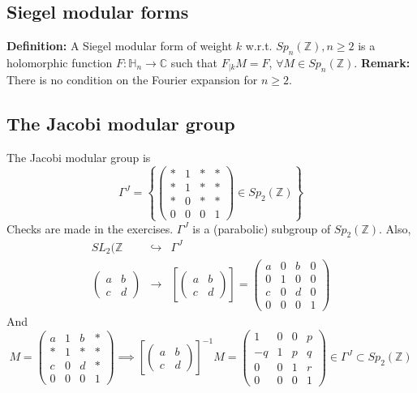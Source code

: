 \documentclass[10pt,a4paper]{article}
\begin{document}
\subsection{Siegel modular forms}
\textbf{Definition: } A Siegel modular form of weight $k$ w.r.t. $Sp_n(\mathbb{Z}),n\geq 2$ is a holomorphic function $F:\mathbb{H}_n\rightarrow\mathbb{C}$ such that $F_{|k}M=F$, $\forall M\in Sp_n(\mathbb{Z})$.
\textbf{Remark: }There is no condition on the Fourier expansion for $n\geq2$.

\subsection{The Jacobi modular group}
The Jacobi modular group is 
\[\Gamma^J=\left\{\left(\begin{array}{cccc}
*&1&*&*\\ *&1&*&*\\ *&0&*&*\\0&0&0&1\end{array}\right)\in Sp_2(\mathbb{Z})\right\}\]
Checks are made in the exercises. 
$\Gamma^J$ is a (parabolic) subgroup of $Sp_2(\mathbb{Z})$. Also, \begin{eqnarray*}
SL_2(\mathbb{Z}&\hookrightarrow&\Gamma^J\\
\left(\begin{array}{cc}a&b\\c&d\end{array}\right)&\rightarrow&\left[\left(\begin{array}{cc}a&b\\c&d\end{array}\right)\right]=\left(\begin{array}{cccc} a&0&b&0\\0&1&0&0\\c&0&d&0\\0&0&0&1\end{array}\right)
\end{eqnarray*}
And
\[M=\left(\begin{array}{cccc}
a&1&b&*\\ *&1&*&*\\ c&0&d&*\\0&0&0&1\end{array}\right)\implies\left[\left(\begin{array}{cc}a&b\\c&d\end{array}\right)\right]^{-1}M=\left(\begin{array}{cccc} 1&0&0&p\\-q&1&p&q\\0&0&1&r\\0&0&0&1\end{array}\right)\in\Gamma^J\subset Sp_2(\mathbb{Z})\]
\end{document}
